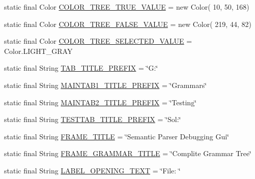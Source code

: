 \begin{DoxyCompactItemize}
\item 
static final Color \hyperlink{classit_1_1emarolab_1_1cagg_1_1debugging_1_1DebuggingDefaults_a2fbef160d6e4e7fc53a1b84a7ea18de0}{C\-O\-L\-O\-R\-\_\-\-T\-R\-E\-E\-\_\-\-T\-R\-U\-E\-\_\-\-V\-A\-L\-U\-E} = new Color( 10, 50, 168)
\item 
static final Color \hyperlink{classit_1_1emarolab_1_1cagg_1_1debugging_1_1DebuggingDefaults_a49fd0ca699df5a691d7ff2bac6e3e14d}{C\-O\-L\-O\-R\-\_\-\-T\-R\-E\-E\-\_\-\-F\-A\-L\-S\-E\-\_\-\-V\-A\-L\-U\-E} = new Color( 219, 44, 82)
\item 
static final Color \hyperlink{classit_1_1emarolab_1_1cagg_1_1debugging_1_1DebuggingDefaults_aeaffc96de31394b2b3b1763db2957a04}{C\-O\-L\-O\-R\-\_\-\-T\-R\-E\-E\-\_\-\-S\-E\-L\-E\-C\-T\-E\-D\-\_\-\-V\-A\-L\-U\-E} = Color.\-L\-I\-G\-H\-T\-\_\-\-G\-R\-A\-Y
\item 
static final String \hyperlink{classit_1_1emarolab_1_1cagg_1_1debugging_1_1DebuggingDefaults_af1e0a6e8862bb7cf68f452b0e83ef0e7}{T\-A\-B\-\_\-\-T\-I\-T\-L\-E\-\_\-\-P\-R\-E\-F\-I\-X} = \char`\"{}G\-:\char`\"{}
\item 
static final String \hyperlink{classit_1_1emarolab_1_1cagg_1_1debugging_1_1DebuggingDefaults_a97f5e1d3d67c6d09e905b02dfbfd7372}{M\-A\-I\-N\-T\-A\-B1\-\_\-\-T\-I\-T\-L\-E\-\_\-\-P\-R\-E\-F\-I\-X} = \char`\"{}Grammars\char`\"{}
\item 
static final String \hyperlink{classit_1_1emarolab_1_1cagg_1_1debugging_1_1DebuggingDefaults_a34b8c4d6a2b9a46ae257bb3bafe44d5d}{M\-A\-I\-N\-T\-A\-B2\-\_\-\-T\-I\-T\-L\-E\-\_\-\-P\-R\-E\-F\-I\-X} = \char`\"{}Testing\char`\"{}
\item 
static final String \hyperlink{classit_1_1emarolab_1_1cagg_1_1debugging_1_1DebuggingDefaults_aa3f1e6adf18ee1283bc869e23552fcae}{T\-E\-S\-T\-T\-A\-B\-\_\-\-T\-I\-T\-L\-E\-\_\-\-P\-R\-E\-F\-I\-X} = \char`\"{}Sol\-:\char`\"{}
\item 
static final String \hyperlink{classit_1_1emarolab_1_1cagg_1_1debugging_1_1DebuggingDefaults_adccb511bb50e7aa10bf058cf364a97da}{F\-R\-A\-M\-E\-\_\-\-T\-I\-T\-L\-E} = \char`\"{}Semantic Parser Debugging Gui\char`\"{}
\item 
static final String \hyperlink{classit_1_1emarolab_1_1cagg_1_1debugging_1_1DebuggingDefaults_abd17ba6b679ef8eece71a6cba1671526}{F\-R\-A\-M\-E\-\_\-\-G\-R\-A\-M\-M\-A\-R\-\_\-\-T\-I\-T\-L\-E} = \char`\"{}Complite Grammar Tree\char`\"{}
\item 
static final String \hyperlink{classit_1_1emarolab_1_1cagg_1_1debugging_1_1DebuggingDefaults_aababae04f814e284df9a8f436053b0e5}{L\-A\-B\-E\-L\-\_\-\-O\-P\-E\-N\-I\-N\-G\-\_\-\-T\-E\-X\-T} = \char`\"{}File\-: \char`\"{}

\end{DoxyCompactItemize}
